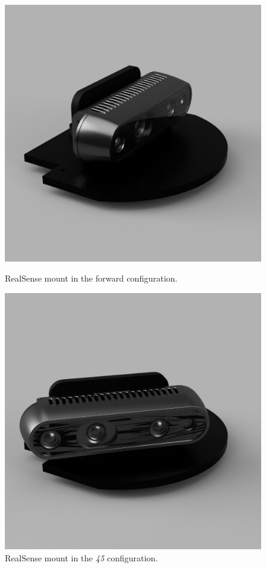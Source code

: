 \documentclass[letterpaper, 10 pt, conference]{ieeeconf}  %
\begin{document}
\begin{figure}[!h]
  \centering
  \begin{minipage}[b]{0.22\textwidth}
    \includegraphics[width=\textwidth]{Figures/straight-rs-mount.png}
    \caption{RealSense mount in the forward configuration.}
  \end{minipage}
  \hfill
  \begin{minipage}[b]{0.22\textwidth}
    \includegraphics[width=\textwidth]{Figures/turned-rs-mount.png}
    \caption{RealSense mount in the \textit{45\textdegree} configuration.}
  \end{minipage}
\end{figure}
\end{document}
